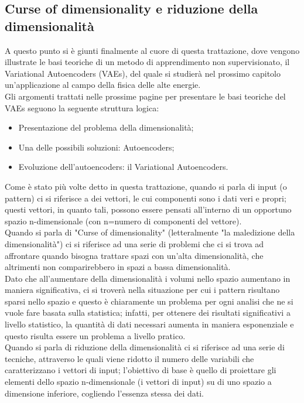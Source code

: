 \newpage


\subsection{Curse of dimensionality e riduzione della dimensionalità}
\label{curse_dim}

A questo punto si è giunti finalmente al cuore di questa trattazione, dove vengono illustrate le basi teoriche di un metodo di apprendimento non supervisionato, il Variational Autoencoders (VAEs), del quale si studierà nel prossimo capitolo un'applicazione al campo della fisica delle alte energie. \\
Gli argomenti trattati nelle prossime pagine per presentare le basi teoriche del VAEs seguono la seguente struttura logica:
\begin{itemize}
	\item  Presentazione del problema della dimensionalità;
	\item Una delle possibili soluzioni: Autoencoders;
	\item Evoluzione dell'autoencoders: il Variational Autoencoders.
\end{itemize}
Come è stato più volte detto in questa trattazione, quando si parla di input (o pattern) ci si riferisce a dei vettori, le cui componenti sono i dati veri e propri; questi vettori, in quanto tali, possono essere pensati all'interno di un opportuno spazio n-dimensionale (con n=numero di componenti del vettore).\\
Quando si parla di "Curse of dimensionality" (letteralmente "la maledizione della dimensionalità") ci si riferisce ad una serie di problemi che ci si trova ad affrontare quando bisogna trattare spazi con un'alta dimensionalità, che altrimenti non comparirebbero in spazi a bassa dimensionalità.  \\
Dato che all'aumentare della dimensionalità i volumi nello spazio aumentano in maniera significativa, ci si troverà nella situazione per cui i pattern risultano sparsi nello spazio e questo è chiaramente un problema per ogni analisi che ne si vuole fare basata sulla statistica; infatti, per ottenere dei risultati significativi a livello statistico, la quantità di dati necessari aumenta in maniera esponenziale e questo risulta essere un problema a livello pratico. \\
Quando si parla di riduzione della dimensionalità ci si riferisce ad una serie di tecniche, attraverso le quali viene ridotto il numero delle variabili che caratterizzano i vettori di input; l'obiettivo di base è quello di proiettare gli elementi dello spazio n-dimensionale (i vettori di input) su di uno spazio a dimensione inferiore, cogliendo l'essenza stessa dei dati.\\
